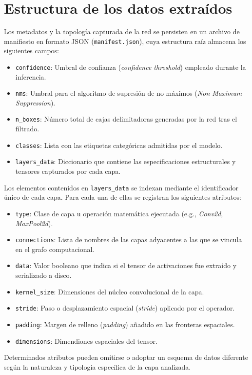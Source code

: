 \section{Estructura de los datos extraídos}
Los metadatos y la topología capturada de la red se persisten en un archivo de manifiesto en formato JSON 
(\texttt{manifest.json}), cuya estructura raíz almacena los siguientes campos:

\begin{itemize}
    \item \texttt{confidence}: Umbral de confianza (\textit{confidence threshold}) empleado durante la inferencia.
    \item \texttt{nms}: Umbral para el algoritmo de supresión de no máximos (\textit{Non-Maximum Suppression}).
    \item \texttt{n\_boxes}: Número total de cajas delimitadoras generadas por la red tras el filtrado.
    \item \texttt{classes}: Lista con las etiquetas categóricas admitidas por el modelo.
    \item \texttt{layers\_data}: Diccionario que contiene las especificaciones estructurales y tensores capturados por cada capa.
\end{itemize}

Los elementos contenidos en \texttt{layers\_data} se indexan mediante el identificador único de cada capa. Para cada una de ellas se 
registran los siguientes atributos:

\begin{itemize}
    \item \texttt{type}: Clase de capa u operación matemática ejecutada (e.g., \textit{Conv2d}, \textit{MaxPool2d}).
    \item \texttt{connections}: Lista de nombres de las capas adyacentes a las que se vincula en el grafo computacional.
    \item \texttt{data}: Valor booleano que indica si el tensor de activaciones fue extraído y serializado a disco.
    \item \texttt{kernel\_size}: Dimensiones del núcleo convolucional de la capa.
    \item \texttt{stride}: Paso o desplazamiento espacial (\textit{stride}) aplicado por el operador.
    \item \texttt{padding}: Margen de relleno (\textit{padding}) añadido en las fronteras espaciales.
    \item \texttt{dimensions}: Dimendiones espaciales del tensor.
\end{itemize}
Determinados atributos pueden omitirse o adoptar un esquema de datos diferente según la naturaleza y tipología específica de la capa analizada.
\medskip

